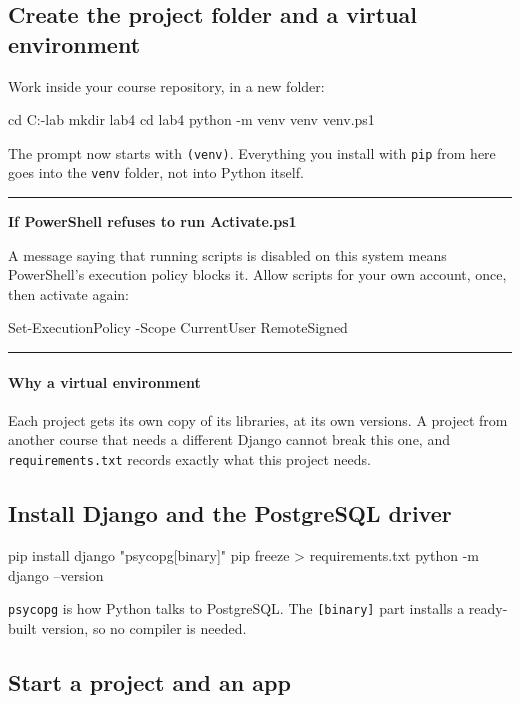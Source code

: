 \documentclass{article}
\newcommand{\cd}[1]{\texttt{#1}}
\newenvironment{keypoint}[1]
  {\par\vspace{.7em}\noindent\rule{\linewidth}{.6pt}\par\vspace{.15em}
   \noindent\textbf{#1}\par\nobreak\vspace{-.3em}}
  {\par\vspace{.15em}\noindent\rule{\linewidth}{.6pt}\par\vspace{.7em}}
\begin{document}
\subsection{Create the project folder and a virtual environment}

Work inside your course repository, in a new folder:

\begin{code}
cd C:\webgis-lab
mkdir lab4
cd lab4
python -m venv venv
venv\Scripts\Activate.ps1
\end{code}

The prompt now starts with \cd{(venv)}. Everything you install with
\cd{pip} from here goes into the \cd{venv} folder, not into Python
itself.

\begin{keypoint}{If PowerShell refuses to run Activate.ps1}
A message saying that running scripts is disabled on this system means
PowerShell's execution policy blocks it. Allow scripts for your own
account, once, then activate again:

\begin{code}
Set-ExecutionPolicy -Scope CurrentUser RemoteSigned
\end{code}
\end{keypoint}

\paragraph{Why a virtual environment}
Each project gets its own copy of its libraries, at its own versions. A
project from another course that needs a different Django cannot break
this one, and \cd{requirements.txt} records exactly what this project
needs.

\subsection{Install Django and the PostgreSQL driver}

\begin{code}
pip install django "psycopg[binary]"
pip freeze > requirements.txt
python -m django --version
\end{code}

\cd{psycopg} is how Python talks to PostgreSQL. The \cd{[binary]} part
installs a ready-built version, so no compiler is needed.

\subsection{Start a project and an app}
\end{document}
